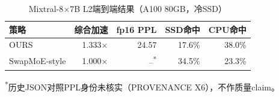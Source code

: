 \begin{table}[!h]
\centering
\caption{Mixtral-8\(\times\)7B L2端到端结果（A100 80GB，冷SSD）}
\label{tab:mixtral_e2e}
\begin{tabular}{lrrrr}
\toprule
策略 & 综合加速 & fp16 PPL & SSD命中 & CPU命中 \\
\midrule
OURS & 1.333\(\times\) & 24.57 & 17.6\% & 38.0\% \\
SwapMoE-style & 1.000\(\times\) & --\textsuperscript{*} & 34.5\% & 23.3\% \\
\bottomrule
\end{tabular}
\vspace{2pt}\footnotesize{\textsuperscript{*}历史JSON对照PPL身份未核实（PROVENANCE X6），不作质量claim。}
\end{table}
